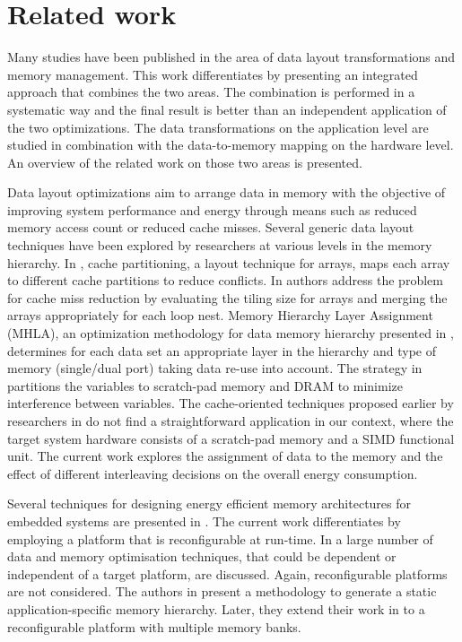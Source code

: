 \documentclass[prodmode,acmtecs]{acmsmall}
\begin{document}
\section{Related work}
\label{sec:related}

Many studies have been published in the area of data layout transformations and memory management. 
This work differentiates by presenting an integrated approach that combines the two areas. 
The combination is performed in a systematic way and the final result is better than an independent application of the two optimizations.
The data transformations on the application level are studied in combination with the data-to-memory mapping on the hardware level.
An overview of the related work on those two areas is presented.

Data layout optimizations aim to arrange data in memory with the objective of improving system performance and energy through means such as reduced memory access count or reduced cache misses. 
Several generic data layout techniques have been explored by researchers at various levels in the memory hierarchy. 
In \cite{4},  cache partitioning, a layout technique for arrays, maps each array to different cache partitions to reduce conflicts. 
In \cite{5} authors address the problem for cache miss reduction by evaluating the tiling size for arrays and merging the arrays appropriately for each loop nest. 
Memory Hierarchy Layer Assignment (MHLA), an optimization methodology for data memory hierarchy presented in \cite{6}, determines for each data set an appropriate layer in the hierarchy and type of memory (single/dual port) taking data re-use into account. 
The strategy in \cite{7} partitions the variables to scratch-pad memory and DRAM to minimize interference between variables. 
 The cache-oriented techniques proposed earlier by researchers in \cite{8} do not find a straightforward application in our context, where the target system hardware consists of a scratch-pad memory and a SIMD functional unit.
 The current work explores the assignment of data to the memory and the effect of different interleaving decisions on the overall energy consumption.

Several techniques for designing energy efficient memory architectures for embedded systems are presented in \cite{Mac02}. 
The current work differentiates by employing a platform that is reconfigurable at run-time. 
In \cite{Pgk01} a large number of data and memory optimisation techniques, that could be dependent or independent of a target platform, are discussed. 
Again, reconfigurable platforms are not considered. 
The authors in \cite{Ben00b} present a methodology to generate a static application-specific memory hierarchy. 
Later, they extend their work in \cite{Ben00c} to a reconfigurable platform with multiple memory banks. 
\end{document}
